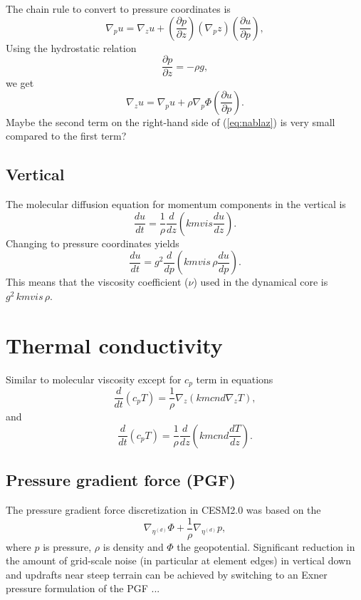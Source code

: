 \documentclass[draft]{agujournal2019}
\begin{document}
The chain rule to convert to pressure coordinates is
\begin{equation}
    \nabla_p u=\nabla_z u +\left( \frac{\partial p}{\partial z}\right) \left( \nabla_p z\right)\left(\frac{\partial u}{\partial p}\right),
\end{equation}
Using the hydrostatic relation
\begin{equation}
    \frac{\partial p}{\partial z}=-\rho g,
\end{equation}
we get
\begin{equation}\label{eq:nablaz}
   \nabla_z u= \nabla_p u+\rho \nabla_p \Phi  \left(\frac{\partial u}{\partial p}\right).
\end{equation}
Maybe the second term on the right-hand side of (\ref{eq:nablaz}) is very small compared to the first term?
\subsection{Vertical}
The molecular diffusion equation for momentum components in the vertical is
\begin{equation}
    \frac{du}{dt}=\frac{1}{\rho}\frac{d}{dz}\left( kmvis \frac{du}{dz}\right).
\end{equation}
Changing to pressure coordinates yields
\begin{equation}
    \frac{du}{dt}=g^2\frac{d}{dp}\left( kmvis \, \rho\frac{du}{dp}\right).
\end{equation}
This means that the viscosity coefficient ($\nu$) used in the dynamical core is $g^2 \, kmvis \, \rho$.
\section{Thermal conductivity}
Similar to molecular viscosity except for $c_p$ term in equations
\begin{equation}
    \frac{d}{dt}\left( c_pT\right)=\frac{1}{\rho}\nabla_z \left( kmcnd \nabla_z T\right),
\end{equation}
and
\begin{equation}
    \frac{d}{dt}\left( c_pT\right)=\frac{1}{\rho}\frac{d}{dz}\left( kmcnd \frac{dT}{dz}\right).
\end{equation}

\subsection{Pressure gradient force (PGF)}
The pressure gradient force discretization in CESM2.0 was based on the 
\begin{equation}
\nabla_{\eta^{(d)}} \Phi + \frac{1}{\rho} \nabla_{\eta^{(d)}} p,
\end{equation}
where $p$ is pressure, $\rho$ is density and $\Phi$ the geopotential. Significant reduction in the amount of grid-scale noise (in particular at element edges) in vertical down and updrafts near steep terrain can be achieved by switching to an Exner pressure formulation of the PGF ...
\end{document}
